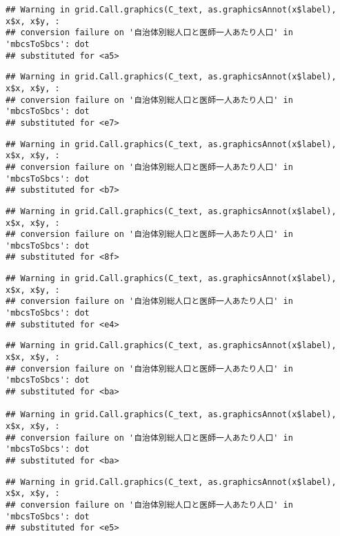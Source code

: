 \documentclass[
]{article}
\begin{document}
\begin{verbatim}
## Warning in grid.Call.graphics(C_text, as.graphicsAnnot(x$label), x$x, x$y, :
## conversion failure on '自治体別総人口と医師一人あたり人口' in 'mbcsToSbcs': dot
## substituted for <a5>
\end{verbatim}

\begin{verbatim}
## Warning in grid.Call.graphics(C_text, as.graphicsAnnot(x$label), x$x, x$y, :
## conversion failure on '自治体別総人口と医師一人あたり人口' in 'mbcsToSbcs': dot
## substituted for <e7>
\end{verbatim}

\begin{verbatim}
## Warning in grid.Call.graphics(C_text, as.graphicsAnnot(x$label), x$x, x$y, :
## conversion failure on '自治体別総人口と医師一人あたり人口' in 'mbcsToSbcs': dot
## substituted for <b7>
\end{verbatim}

\begin{verbatim}
## Warning in grid.Call.graphics(C_text, as.graphicsAnnot(x$label), x$x, x$y, :
## conversion failure on '自治体別総人口と医師一人あたり人口' in 'mbcsToSbcs': dot
## substituted for <8f>
\end{verbatim}

\begin{verbatim}
## Warning in grid.Call.graphics(C_text, as.graphicsAnnot(x$label), x$x, x$y, :
## conversion failure on '自治体別総人口と医師一人あたり人口' in 'mbcsToSbcs': dot
## substituted for <e4>
\end{verbatim}

\begin{verbatim}
## Warning in grid.Call.graphics(C_text, as.graphicsAnnot(x$label), x$x, x$y, :
## conversion failure on '自治体別総人口と医師一人あたり人口' in 'mbcsToSbcs': dot
## substituted for <ba>

## Warning in grid.Call.graphics(C_text, as.graphicsAnnot(x$label), x$x, x$y, :
## conversion failure on '自治体別総人口と医師一人あたり人口' in 'mbcsToSbcs': dot
## substituted for <ba>
\end{verbatim}

\begin{verbatim}
## Warning in grid.Call.graphics(C_text, as.graphicsAnnot(x$label), x$x, x$y, :
## conversion failure on '自治体別総人口と医師一人あたり人口' in 'mbcsToSbcs': dot
## substituted for <e5>
\end{verbatim}
\end{document}
